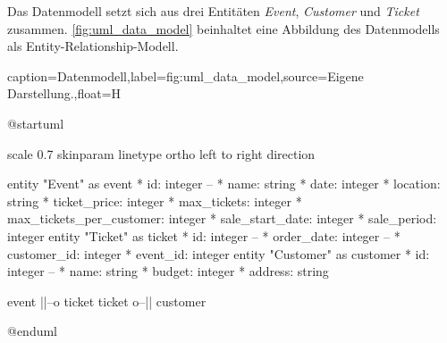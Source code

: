 Das Datenmodell setzt sich aus drei Entitäten \textit{Event}, \textit{Customer} und \textit{Ticket} zusammen.
\autoref{fig:uml_data_model} beinhaltet eine Abbildung des Datenmodells als Entity-Relationship-Modell.

\begin{dhbwfigure}{caption=Datenmodell,label=fig:uml_data_model,source={Eigene Darstellung.},float=H}
    \begin{plantuml}
        @startuml

        scale 0.7
        skinparam linetype ortho
        left to right direction

        entity "Event" as event {
            * id: integer
            --
            * name: string
            * date: integer
            * location: string
            * ticket_price: integer
            * max_tickets: integer
            * max_tickets_per_customer: integer
            * sale_start_date: integer
            * sale_period: integer
        }   
        entity "Ticket" as ticket {
            * id: integer
            --
            * order_date: integer
            --
            * customer_id: integer
            * event_id: integer
        }
        entity "Customer" as customer {
            * id: integer
            --
            * name: string
            * budget: integer
            * address: string
        }

        event ||--o{ ticket
        ticket }o--|| customer

        @enduml
    \end{plantuml}
\end{dhbwfigure}

